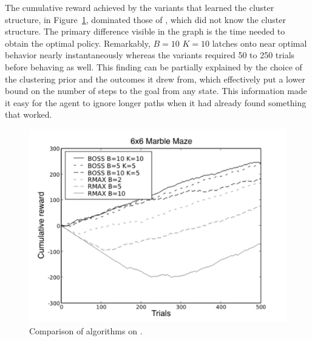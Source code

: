 The cumulative
reward achieved by the  variants that learned the cluster
structure, in Figure~\ref{f:marblegraph}, dominated those of , which did not know the cluster
structure.  The primary difference visible in the graph is the time
needed to obtain the optimal policy.  Remarkably,  $B=10$ $K=10$
latches onto near optimal behavior nearly instantaneously whereas the
 variants required 50 to 250 trials before behaving as well.
This finding can be partially explained by the choice of the clustering prior
and the outcomes it drew from, which effectively put a lower bound on
the number of steps to the goal from any state.  This information made it easy for
the agent to ignore longer paths when it had already found something that
worked.

\begin{figure}[t]
\begin{center}
\includegraphics[width=1.0\linewidth]{marblemaze}
\caption{Comparison of algorithms on .}
\label{f:marblegraph}
\end{center}
\end{figure}

